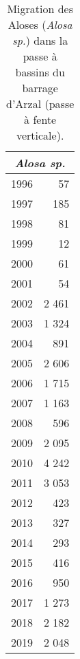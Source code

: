 \begin{table}[ht]
\centering
\begin{tabular}{lr}
  \toprule
  \multicolumn{2}{c}{\textit{Alosa sp.}} \\
 \midrule
1996 & 57 \\ 
  1997 & 185 \\ 
  1998 & 81 \\ 
  1999 & 12 \\ 
  2000 & 61 \\ 
  2001 & 54 \\ 
  2002 & 2 461 \\ 
  2003 & 1 324 \\ 
  2004 & 891 \\ 
  2005 & 2 606 \\ 
  2006 & 1 715 \\ 
  2007 & 1 163 \\ 
  2008 & 596 \\ 
  2009 & 2 095 \\ 
  2010 & 4 242 \\ 
  2011 & 3 053 \\ 
  2012 & 423 \\ 
  2013 & 327 \\ 
  2014 & 293 \\ 
  2015 & 416 \\ 
  2016 & 950 \\ 
  2017 & 1 273 \\ 
  2018 & 2 182 \\ 
  2019 & 2 048 \\ 
   \bottomrule
\end{tabular}
\caption{Migration des Aloses (\textit{Alosa sp.}) dans la passe à bassins du
barrage d'Arzal (passe à fente verticale).} 
\label{table_bilanannuel_ala}
\end{table}
